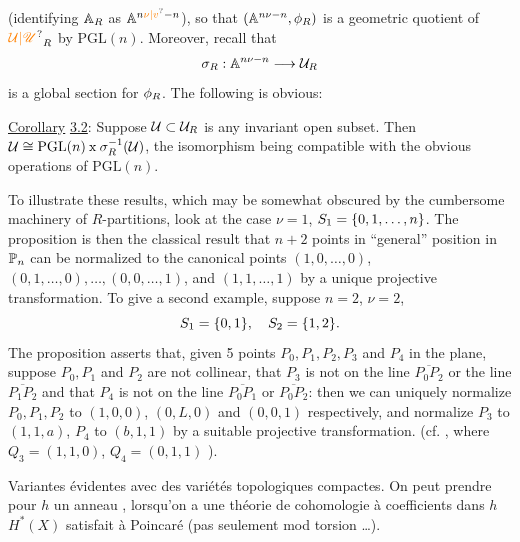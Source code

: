 (identifying $\mathbb{A}_R$ as $\handwritten{\mathbb{A}}^{n\unsure{\nu|v}-n}$), so that $(\mathbb{A}^{n\nu-n},\phi_R)$ is a geometric
quotient of $\handwritten{\unsure{\mathcal{U}|\mathscr{U}}}_R$ by $\mathrm{PGL}(n)$. Moreover, recall that
\[
\sigma_R:\mathbb{A}^{n\nu-n}\longrightarrow\mathcal{U}_R
\]
is a global section for $\phi_R$. The following is obvious:

\uline{Corollary} \uline{3.2}: Suppose $\mathcal{U}\subset\mathcal{U}_R$ is any invariant open subset. Then
$\mathcal{U}\cong\mathrm{PGL}(n)\mathbin{\mathrm{x}}\sigma_R^{-1}(\mathcal{U})$, the isomorphism being compatible with the
obvious operations of $\mathrm{PGL}(n)$.

To illustrate these results, which may be somewhat obscured by the
cumbersome machinery of $R$-partitions, look at the case $\nu=1$, $S_1=\{0,1,\ldots,n\}$.
The proposition is then the classical result that $n+2$ points in
``general'' position in $\mathbb{P}_n$ can be normalized to the canonical points
$(1,0,\ldots,0)$, $(0,1,\ldots,0),\ldots,(0,0,\ldots,1)$, and $(1,1,\ldots,1)$ by a unique
projective transformation. To give a second example, suppose $n=2$,
$\nu=2$,
\[
S_1=\{0,1\},\quad S_2=\{1,2\}.
\]
The proposition asserts that, given 5 points $P_0,P_1,P_2,P_3$ and $P_4$ in
the plane, suppose $P_0,P_1$ and $P_2$ are not collinear, that $P_3$ is not
on the line $\overline{P_0P_2}$ or the line $\overline{P_1P_2}$ and that $P_4$ is not on the line
$\overline{P_0P_1}$ or $\overline{P_0P_2}$: then we can uniquely normalize $P_0,P_1,P_2$ to $(1,0,0)$,
$(0,L,0)$ and $(0,0,1)$ respectively, and normalize $P_3$ to $(1,1,a)$, $P_4$
to $(b,1,1)$ by a suitable projective transformation. (cf. ,
where $Q_3=(1,1,0)$, $Q_4=(0,1,1)$ ).

Variantes évidentes avec des variétés topologiques compactes.
On peut prendre pour $h$ un anneau , lorsqu'on a une théorie
de cohomologie à coefficients dans $h$  
 $H^*(X)$ satisfait à Poincaré  (pas seulement
mod torsion \ldots).

